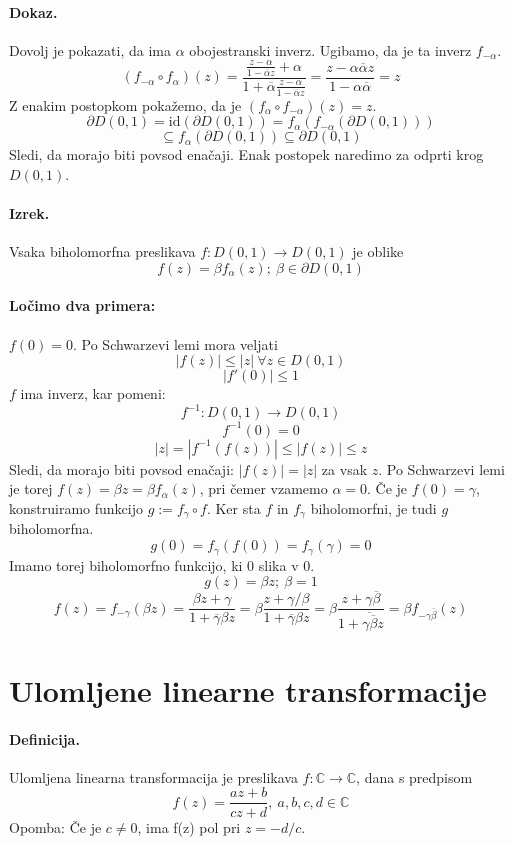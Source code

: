 \documentclass[a4paper]{article}
\newcommand{\C}{\mathbb{C}}
\newcommand{\fn}[3]{{#1}\colon {#2} \rightarrow {#3}}
\begin{document}
\paragraph{Dokaz.} Dovolj je pokazati, da ima $\alpha$ obojestranski inverz. Ugibamo, da je ta inverz $f_{-\alpha}$.
$$\left(f_{-\alpha} \circ f_\alpha\right)(z) = \frac{\frac{z-\alpha}{1-\overline{\alpha}z} + \alpha}{1 + \overline{\alpha}\frac{z-\alpha}{1-\overline{\alpha}z}} = \frac{z - \alpha\overline{\alpha}z}{1 - \alpha\overline{\alpha}} = z$$
Z enakim postopkom pokažemo, da je $\displaystyle{\left(f_\alpha \circ f_{-\alpha}\right)(z) = z}$.
$$\partial D(0, 1) = \mathrm{id}\left(\partial D(0, 1)\right) = f_\alpha\left(f_{-\alpha}\left(\partial D(0, 1)\right)\right)$$
$$\subseteq f_\alpha\left(\partial D(0, 1)\right) \subseteq \partial D(0, 1)$$
Sledi, da morajo biti povsod enačaji.
Enak postopek naredimo za odprti krog $D(0, 1)$.
\paragraph{Izrek.} Vsaka biholomorfna preslikava $\fn{f}{D(0, 1)}{D(0, 1)}$ je oblike
$$f(z) = \beta f_\alpha(z);~\beta \in \partial D(0, 1)$$
\paragraph{Ločimo dva primera:} $f(0) = 0$. Po Schwarzevi lemi mora veljati
$$|f(z)|\leq|z|~\forall z\in D(0, 1)$$
$$|f'(0)|\leq 1$$
$f$ ima inverz, kar pomeni:
$$\fn{f^{-1}}{D(0, 1)}{D(0, 1)}$$
$$f^{-1}(0) = 0$$
$$|z| = |f^{-1}\left(f(z)\right)| \leq |f(z)| \leq z$$
Sledi, da morajo biti povsod enačaji: $|f(z)| = |z|$ za vsak $z$. Po Schwarzevi lemi je torej $f(z) = \beta z = \beta f_\alpha(z)$, pri čemer vzamemo $\alpha = 0$.
Če je $f(0) = \gamma$, konstruiramo funkcijo $g := f_\gamma \circ f$.
Ker sta $f$ in $f_\gamma$ biholomorfni, je tudi $g$ biholomorfna.
$$g(0) = f_\gamma(f(0)) = f_\gamma (\gamma) = 0$$
Imamo torej biholomorfno funkcijo, ki 0 slika v 0.
$$g(z) = \beta z;~\beta = 1$$
$$f(z) = f_{-\gamma}(\beta z) = \frac{\beta z + \gamma}{1 + \overline{\gamma}\beta z} = \beta \frac{z + \gamma/\beta}{1 + \overline{\gamma}{\beta}z} = \beta\frac{z + \gamma\overline{\beta}}{1 + \overline{\gamma\overline{\beta}}z} = \beta f_{-\gamma\overline{\beta}}(z)$$
\section{Ulomljene linearne transformacije}
\paragraph{Definicija.} Ulomljena linearna transformacija je preslikava $\fn{f}{\C}{\C}$, dana s predpisom
$$f(z) = \frac{az+b}{cz+d},~a, b, c, d \in \C$$
Opomba: Če je $c \neq 0$, ima f(z) pol pri $z=-d/c$.
\end{document}
